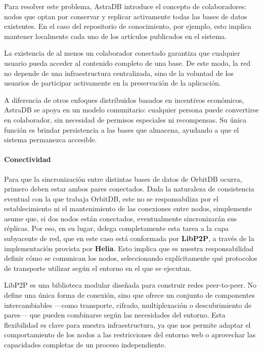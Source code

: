 Para resolver este problema, AstraDB introduce el concepto de colaboradores: nodos que optan por conservar y replicar activamente todas las bases de datos existentes. En el caso del repositorio de conocimiento, por ejemplo, esto implica mantener localmente cada uno de los artículos publicados en el sistema.

La existencia de al menos un colaborador conectado garantiza que cualquier usuario pueda acceder al contenido completo de una base. De este modo, la red no depende de una infraestructura centralizada, sino de la voluntad de los usuarios de participar activamente en la preservación de la aplicación.

A diferencia de otros enfoques distribuidos basados en incentivos económicos, AstraDB se apoya en un modelo comunitario: cualquier persona puede convertirse en colaborador, sin necesidad de permisos especiales ni recompensas. Su única función es brindar persistencia a las bases que almacena, ayudando a que el sistema permanezca accesible.

\paragraph{Conectividad}

Para que la sincronización entre distintas bases de datos de OrbitDB ocurra, primero deben estar ambos pares conectados. Dada la naturaleza de consistencia eventual con la que trabaja OrbitDB, este no se responsabiliza por el establecimiento ni el mantenimiento de las conexiones entre nodos, simplemente asume que, si dos nodos están conectados, eventualmente sincronizarán sus réplicas.  Por eso, en su lugar, delega completamente esta tarea a la capa subyacente de red, que en este caso está conformada por \textbf{LibP2P}\cite{libp2p}, a través de la implementación provista por \textbf{Helia}\cite{helia}. Esto implica que es nuestra responsabilidad definir cómo se comunican los nodos, seleccionando explícitamente qué protocolos de transporte utilizar según el entorno en el que se ejecutan.

LibP2P es una biblioteca modular diseñada para construir redes peer-to-peer. No define una única forma de conexión, sino que ofrece un conjunto de componentes intercambiables —como transporte, cifrado, multiplexación o descubrimiento de pares— que pueden combinarse según las necesidades del entorno. Esta flexibilidad es clave para nuestra infraestructura, ya que nos permite adaptar el comportamiento de los nodos a las restricciones del entorno web o aprovechar las capacidades completas de un proceso independiente.


